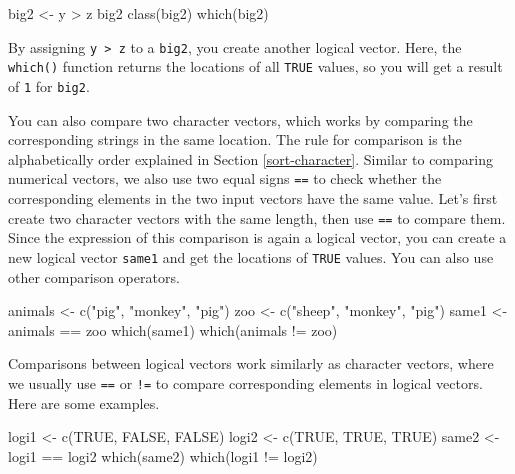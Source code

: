 \documentclass[
]{book}
\newenvironment{Shaded}{\begin{snugshade}}{\end{snugshade}}
\newcommand{\ConstantTok}[1]{\textcolor[rgb]{0.00,0.00,0.00}{#1}}
\newcommand{\FunctionTok}[1]{\textcolor[rgb]{0.00,0.00,0.00}{#1}}
\newcommand{\NormalTok}[1]{#1}
\newcommand{\OtherTok}[1]{\textcolor[rgb]{0.56,0.35,0.01}{#1}}
\newcommand{\SpecialCharTok}[1]{\textcolor[rgb]{0.00,0.00,0.00}{#1}}
\newcommand{\StringTok}[1]{\textcolor[rgb]{0.31,0.60,0.02}{#1}}
\begin{document}
\begin{Shaded}
\begin{Highlighting}[]
\NormalTok{big2 }\OtherTok{\textless{}{-}}\NormalTok{ y }\SpecialCharTok{\textgreater{}}\NormalTok{ z}
\NormalTok{big2}
\FunctionTok{class}\NormalTok{(big2)}
\FunctionTok{which}\NormalTok{(big2)}
\end{Highlighting}
\end{Shaded}

By assigning \texttt{y\ \textgreater{}\ z} to a \texttt{big2}, you create another logical vector. Here, the \texttt{which()} function returns the locations of all \texttt{TRUE} values, so you will get a result of \texttt{1} for \texttt{big2}.

You can also compare two character vectors, which works by comparing the corresponding strings in the same location. The rule for comparison is the alphabetically order explained in Section \ref{sort-character}. Similar to comparing numerical vectors, we also use two equal signs \texttt{==} to check whether the corresponding elements in the two input vectors have the same value. Let's first create two character vectors with the same length, then use \texttt{==} to compare them. Since the expression of this comparison is again a logical vector, you can create a new logical vector \texttt{same1} and get the locations of \texttt{TRUE} values. You can also use other comparison operators.

\begin{Shaded}
\begin{Highlighting}[]
\NormalTok{animals }\OtherTok{\textless{}{-}} \FunctionTok{c}\NormalTok{(}\StringTok{"pig"}\NormalTok{, }\StringTok{"monkey"}\NormalTok{, }\StringTok{"pig"}\NormalTok{)}
\NormalTok{zoo }\OtherTok{\textless{}{-}} \FunctionTok{c}\NormalTok{(}\StringTok{"sheep"}\NormalTok{, }\StringTok{"monkey"}\NormalTok{, }\StringTok{"pig"}\NormalTok{)}
\NormalTok{same1 }\OtherTok{\textless{}{-}}\NormalTok{ animals }\SpecialCharTok{==}\NormalTok{ zoo}
\FunctionTok{which}\NormalTok{(same1)}
\FunctionTok{which}\NormalTok{(animals }\SpecialCharTok{!=}\NormalTok{ zoo)}
\end{Highlighting}
\end{Shaded}

Comparisons between logical vectors work similarly as character vectors, where we usually use \texttt{==} or \texttt{!=} to compare corresponding elements in logical vectors. Here are some examples.

\begin{Shaded}
\begin{Highlighting}[]
\NormalTok{logi1 }\OtherTok{\textless{}{-}} \FunctionTok{c}\NormalTok{(}\ConstantTok{TRUE}\NormalTok{, }\ConstantTok{FALSE}\NormalTok{, }\ConstantTok{FALSE}\NormalTok{)     }
\NormalTok{logi2 }\OtherTok{\textless{}{-}} \FunctionTok{c}\NormalTok{(}\ConstantTok{TRUE}\NormalTok{, }\ConstantTok{TRUE}\NormalTok{, }\ConstantTok{TRUE}\NormalTok{)}
\NormalTok{same2 }\OtherTok{\textless{}{-}}\NormalTok{ logi1 }\SpecialCharTok{==}\NormalTok{ logi2}
\FunctionTok{which}\NormalTok{(same2)}
\FunctionTok{which}\NormalTok{(logi1 }\SpecialCharTok{!=}\NormalTok{ logi2)}
\end{Highlighting}
\end{Shaded}
\end{document}
